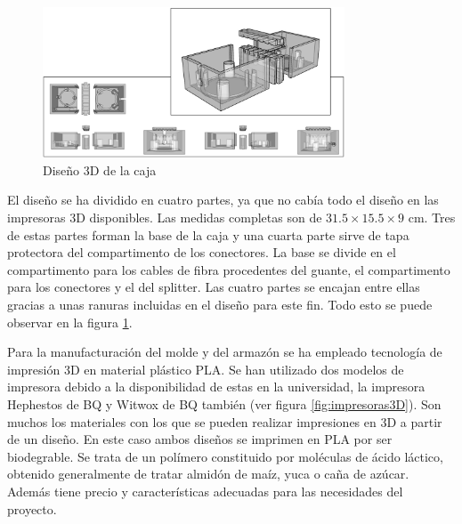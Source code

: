 \begin{itemize}
  	\begin{figure}[H]
		\centering
		\includegraphics[width=0.8\textwidth]{./img/caja}
		\caption{Diseño 3D de la caja} \label{fig:caja}
	\end{figure}
 	
 	El diseño se ha dividido en cuatro partes, ya que no cabía todo el diseño en las impresoras 3D disponibles. Las medidas completas son de $31.5\times15.5\times9$ cm. Tres de estas partes forman la base de la caja y una cuarta parte sirve de tapa protectora del compartimento de los conectores. La base se divide en el compartimento para los cables de fibra procedentes del guante, el compartimento para los conectores  y el del splitter. Las cuatro partes se encajan entre ellas gracias a unas ranuras incluidas en el diseño para este fin. Todo esto se puede observar en la figura \ref{fig:caja}.
 

 	Para la manufacturación del molde y del armazón se ha empleado tecnología de impresión 3D en material plástico PLA. Se han utilizado dos modelos de impresora debido a la disponibilidad de estas en la universidad, la impresora Hephestos de BQ y Witwox de BQ también (ver figura \ref{fig:impresoras3D}). Son muchos los materiales con los que se pueden realizar impresiones en 3D a partir de un diseño. En este caso ambos diseños se imprimen en PLA por ser biodegrable. Se trata de un polímero constituido por moléculas de ácido láctico, obtenido generalmente de tratar almidón de maíz, yuca o caña de azúcar. Además tiene precio y características adecuadas para las necesidades del proyecto. \cite{bioPLA}
 	

\end{itemize}
